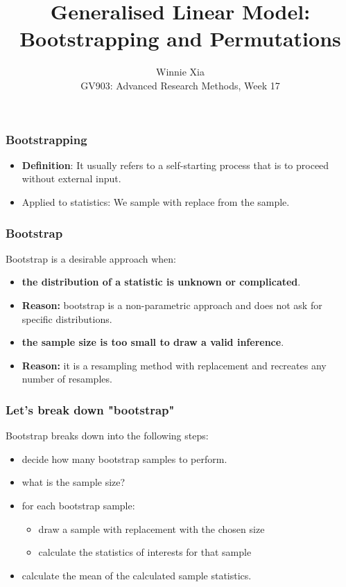 \documentclass{beamer}\usepackage[]{graphicx}\usepackage[]{xcolor}
\title{Generalised Linear Model: Bootstrapping and Permutations}
\author{Winnie Xia \\ \vspace{5mm} \scriptsize GV903: Advanced Research Methods, Week 17}
\begin{document}
\def\solutions{} %



\begin{frame}[plain]
\titlepage
\end{frame}

\begin{frame}
\end{frame}

\begin{frame}
\frametitle{Bootstrapping}
\begin{itemize}
\item \textbf{Definition}: It usually refers to a self-starting process that is to proceed without external input.
\item Applied to statistics: We sample with replace from the sample.
\end{itemize}
\end{frame}

\begin{frame}
\frametitle{Bootstrap}
Bootstrap is a desirable approach when:
\begin{itemize}
\item \textbf{the distribution of a statistic is unknown or complicated}.
\item \textbf{Reason:} bootstrap is a non-parametric approach and does not ask for specific distributions.
\item \textbf{the sample size is too small to draw a valid inference}.
\item \textbf{Reason:} it is a resampling method with replacement and recreates any number of resamples. 
\end{itemize}
\end{frame}

\begin{frame}
\frametitle{Let's break down "bootstrap"}
Bootstrap breaks down into the following steps:
\begin{itemize}
\item decide how many bootstrap samples to perform.
\item what is the sample size?
\item for each bootstrap sample:
\begin{itemize}
\item draw a sample with replacement with the chosen size
\item calculate the statistics of interests for that sample
\end{itemize}
\item calculate the mean of the calculated sample statistics. 
\end{itemize}
\end{frame}
\end{document}
